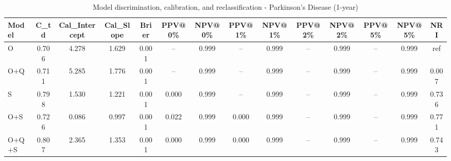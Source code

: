 \begin{table}[htbp]
\centering
\small
\caption{Model discrimination, calibration, and reclassification - Parkinson's Disease (1-year)}
\label{tab:perf_pd_1y}
\begin{tabular}{lccccccccccccc}
\toprule
Model & C\_td & Cal\_Intercept & Cal\_Slope & Brier & PPV@0\% & NPV@0\% & PPV@1\% & NPV@1\% & PPV@2\% & NPV@2\% & PPV@5\% & NPV@5\% & NRI \\
\midrule
O & 0.706 & 4.278 & 1.629 & 0.001 & -- & 0.999 & -- & 0.999 & -- & 0.999 & -- & 0.999 & ref \\
O+Q & 0.711 & 5.285 & 1.776 & 0.001 & -- & 0.999 & -- & 0.999 & -- & 0.999 & -- & 0.999 & 0.007 \\
S & 0.798 & 1.530 & 1.221 & 0.001 & 0.000 & 0.999 & -- & 0.999 & -- & 0.999 & -- & 0.999 & 0.736 \\
O+S & 0.726 & 0.086 & 0.997 & 0.001 & 0.022 & 0.999 & 0.000 & 0.999 & -- & 0.999 & -- & 0.999 & 0.771 \\
O+Q+S & 0.807 & 2.365 & 1.353 & 0.001 & 0.000 & 0.999 & 0.000 & 0.999 & -- & 0.999 & -- & 0.999 & 0.743 \\
\bottomrule
\end{tabular}
\end{table}